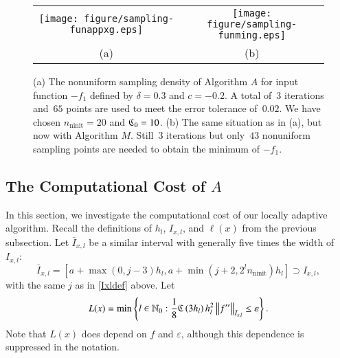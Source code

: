 \documentclass[review]{elsarticle}
\newcommand{\abstol}{\varepsilon}
\theoremstyle{definition}
\newcommand{\Ixl}{I_{x,l}}
\DeclareMathOperator{\ninit}{ninit}
\begin{document}
\begin{figure}[t]
	\begin{tabular}{cc}	
		\texttt{[image: figure/sampling-funappxg.eps]}
		&\texttt{[image: figure/sampling-funming.eps]}
		\\ (a) & (b)
	\end{tabular}
	\caption{(a) The nonuniform sampling density of Algorithm $A$ for input function
		$-f_1$ defined by $\delta = 0.3$ and $c = -0.2$. A total of~$3$ iterations
		and~$65$ points are used to meet the error tolerance
		of~$0.02$.  We have chosen $n_{\ninit} = 20$ and $\mathfrak{C}_0 = 10$.
		(b) The same situation as in (a), but now
		with Algorithm $M$. Still~$3$ iterations but only~$43$ nonuniform
		sampling points are needed to obtain the minimum of $-f_1$. 	
		\label{f3foolplot}}
\end{figure}

\subsection{The Computational Cost of $A$} \label{subsec:appxcost}

In this section, we investigate the computational cost of our locally adaptive
algorithm. Recall the definitions of $h_l$, $\Ixl$, and $\ell(x)$ from the
previous subsection. Let
$\bar{I}_{x,l}$ be a similar interval with generally five times the
width of~$\Ixl$:
\begin{equation} \label{barIxldef}
\bar{I}_{x,l}=\left[a+\max(0,j-3)h_l, a+ \min(j+2,2^l n_{\ninit})h_l\right] \supset \Ixl,
\end{equation}
with the same $j$ as in \eqref{Ixldef} above.  Let
\begin{equation}\label{eqn:defoflx}
L(x) = \min \left\{ l \in \mathbb{N}_0 :  \frac{1}{8} \fC\left(3h_l\right)h_l^2\norm[\bar{I}_{x,l}]{f''} \le \abstol \right\}.
\end{equation}
Note that $L(x)$ does depend on $f$ and $\abstol$, although this dependence is
suppressed in the notation.
\end{document}
